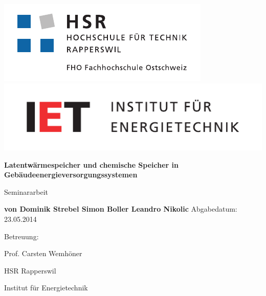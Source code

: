 
\begin{titlepage}
\begin{center}
\includegraphics[scale=0.8]{images/HSR.pdf}
\linebreak \includegraphics[scale=0.3]{images/IET.pdf}
\end{center}

\vspace{2.5cm}
\begin{center}
\textbf{Latentwärmespeicher und chemische Speicher
in Gebäudeenergieversorgungssystemen}
\linebreak
\end{center}
\vspace{1.8cm}
\begin{center}
Seminararbeit
\end{center}
\vspace{1cm}
\begin{center}
\textbf{von \linebreak Dominik Strebel \linebreak Simon Boller \linebreak
Leandro Nikolic} \linebreak
\linebreak 
Abgabedatum: 23.05.2014
\linebreak
\end{center}
\vspace{3cm}
\noindent Betreuung:

\noindent Prof. Carsten Wemhöner

\noindent HSR Rapperswil

\noindent Institut für Energietechnik

\end{titlepage}
\renewcommand{\footrulewidth}{0pt}
\renewcommand{\headrulewidth}{0pt}
\lhead{}
\chead{}
\rhead{}
\cfoot{} 


